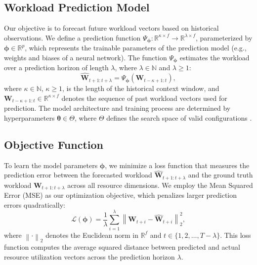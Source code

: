 \documentclass{ieeetmlcn}
\begin{document}
\subsection{Workload Prediction Model}

Our objective is to forecast future workload vectors based on historical observations. We define a prediction function $\Psi_{\boldsymbol{\phi}}: \mathbb{R}^{\kappa \times f} \rightarrow \mathbb{R}^{\lambda \times f}$, parameterized by $\boldsymbol{\phi} \in \mathbb{R}^p$, which represents the trainable parameters of the prediction model (e.g., weights and biases of a neural network). The function $\Psi_{\boldsymbol{\phi}}$ estimates the workload over a prediction horizon of length $\lambda$, where $\lambda \in \mathbb{N}$ and $\lambda \geq 1$:
\begin{equation}
\label{eq:forecast_workload}
\hat{\mathbf{W}}_{t+1:t+\lambda} = \Psi_{\boldsymbol{\phi}}\left( \mathbf{W}_{t-\kappa+1:t} \right),
\end{equation}
where $\kappa \in \mathbb{N}$, $\kappa \geq 1$, is the length of the historical context window, and $\mathbf{W}_{t-\kappa+1:t} \in \mathbb{R}^{\kappa \times f}$ denotes the sequence of past workload vectors used for prediction. The model architecture and training process are determined by hyperparameters $\boldsymbol{\theta} \in \Theta$, where $\Theta$ defines the search space of valid configurations \cite{hyperparamsdatasets}.

\subsection{Objective Function}

To learn the model parameters $\boldsymbol{\phi}$, we minimize a loss function that measures the prediction error between the forecasted workload $\hat{\mathbf{W}}_{t+1:t+\lambda}$ and the ground truth workload $\mathbf{W}_{t+1:t+\lambda}$ across all resource dimensions. We employ the Mean Squared Error (MSE) as our optimization objective, which penalizes larger prediction errors quadratically: 
\begin{equation}
\mathcal{L}(\boldsymbol{\phi}) = \frac{1}{\lambda} \sum_{i=1}^{\lambda} \left\| \mathbf{W}_{t+i} - \hat{\mathbf{W}}_{t+i} \right\|_2^2,
\end{equation}
where $\left\| \cdot \right\|_2$ denotes the Euclidean norm in $\mathbb{R}^f$ and $t \in \{1, 2, \ldots, T-\lambda\}$. This loss function computes the average squared distance between predicted and actual resource utilization vectors across the prediction horizon $\lambda$.
\end{document}
